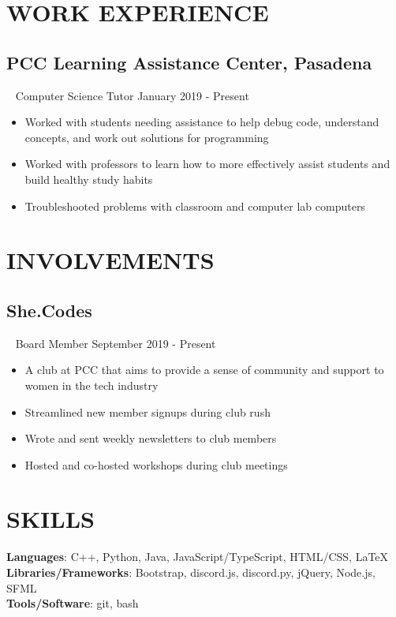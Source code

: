 \documentclass{article}
\newcommand{\resumesection}[3]{
    \subsection*{#1}
    \ 
    \footnotesize
    \textcolor{wordgrey}{#2}
    \normalsize
    \hfill
    \textcolor{wordgrey}{#3}
}
\begin{document}
\section*{WORK EXPERIENCE}
\resumesection{PCC Learning Assistance Center, Pasadena}{Computer Science Tutor}{January 2019 - Present}
\begin{itemize}
    \item Worked with students needing assistance to help debug code, understand concepts, and work out solutions for programming 
    \item Worked with professors to learn how to more effectively assist students and build healthy study habits
    \item Troubleshooted problems with classroom and computer lab computers
\end{itemize}
\hfill

\section*{INVOLVEMENTS}
\resumesection{She.Codes}{Board Member}{September 2019 - Present}
\begin{itemize}
    \item A club at PCC that aims to provide a sense of community and support to women in the tech industry
    \item Streamlined new member signups during club rush
    \item Wrote and sent weekly newsletters to club members
    \item Hosted and co-hosted workshops during club meetings
\end{itemize}
\hfill

\section*{SKILLS}
\textbf{Languages}: C++, Python, Java, JavaScript/TypeScript, HTML/CSS, {\selectfont\LaTeX}\\
\textbf{Libraries/Frameworks}: Bootstrap, discord.js, discord.py, jQuery, Node.js, SFML\\
\textbf{Tools/Software}: git, bash
\end{document}
